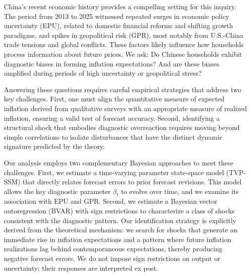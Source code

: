 \documentclass[12pt]{article}
\begin{document}
China's recent economic history provides a compelling setting for this inquiry. The period from 2013 to 2025 witnessed repeated surges in economic policy uncertainty (EPU), related to domestic financial reforms and shifting growth paradigms, and spikes in geopolitical risk (GPR), most notably from U.S.-China trade tensions and global conflicts. These factors likely influence how households process information about future prices. We ask: Do Chinese households exhibit diagnostic biases in forming inflation expectations? And are these biases amplified during periods of high uncertainty or geopolitical stress?

Answering these questions requires careful empirical strategies that address two key challenges. First, one must align the quantitative measure of expected inflation derived from qualitative surveys with an appropriate measure of realized inflation, ensuring a valid test of forecast accuracy. Second, identifying a structural shock that embodies diagnostic overreaction requires moving beyond simple correlations to isolate disturbances that have the distinct dynamic signature predicted by the theory.

Our analysis employs two complementary Bayesian approaches to meet these challenges. First, we estimate a time-varying parameter state-space model (TVP-SSM) that directly relates forecast errors to prior forecast revisions. This model allows the key diagnostic parameter $\beta_t$ to evolve over time, and we examine its association with EPU and GPR. Second, we estimate a Bayesian vector autoregression (BVAR) with sign restrictions to characterize a class of shocks consistent with the diagnostic pattern. Our identification strategy is explicitly derived from the theoretical mechanism: we search for shocks that generate an immediate rise in inflation expectations and a pattern where future inflation realizations lag behind contemporaneous expectations, thereby producing negative forecast errors. We do not impose sign restrictions on output or uncertainty; their responses are interpreted ex post.
\end{document}
